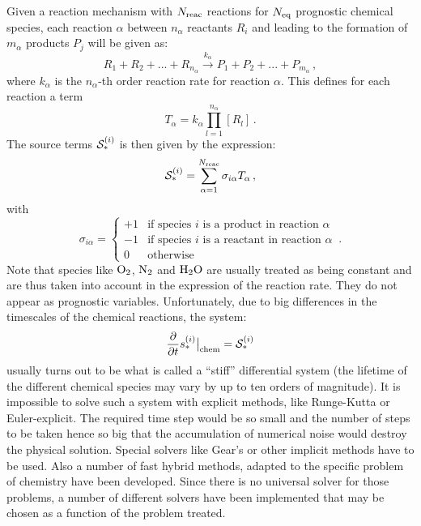 Given a reaction mechanism with $N_{\rm reac}$ reactions for $N_{\rm eq}$ prognostic
chemical species,
each reaction $\alpha$ between $n_\alpha$
reactants $R_i$ and leading to the formation
of $m_\alpha$ products $P_j$ will be given as:
%
\begin{equation}
R_1 + R_2 + ... + R_{n_\alpha} \stackrel{k_\alpha}{\longrightarrow}
P_1 + P_2 + ... + P_{m_\alpha}
\,,
\end{equation}
%
where $k_\alpha$ is the $n_\alpha$-th order reaction rate for reaction $\alpha$.
This defines for each reaction a term
%
\begin{equation}
  T_\alpha = k_\alpha \prod_{l=1}^{n_\alpha} [R_l]
  \,.
\end{equation}
%
The source terms ${\cal S}_\ast^{(i)}$ is then given by the expression:
%
\begin{equation}
  {\cal S}_\ast^{(i)} = \sum_{\alpha=1}^{N_{\rm reac}} \sigma_{i\alpha}  T_\alpha
  \,,
\end{equation}
%
with
%
\begin{equation}
  \sigma_{i\alpha} = \left\{
    \begin{array}{rl}
      +1 & \mbox{if species $i$ is a product in reaction $\alpha$} \\
      -1 & \mbox{if species $i$ is a reactant in reaction $\alpha$} \\
      0 & \mbox{otherwise}
    \end{array}
  \right.\,.
\end{equation}
%
Note that species like $\rm O_2$, $\rm N_2$ and $\rm H_2O$
are usually treated as being  constant and are thus taken into account
in the expression of the reaction rate.
They do not appear as prognostic variables.
Unfortunately, due to big differences in the timescales of the
chemical reactions, the system:
%
\begin{equation}
  \frac{\partial}{\partial t} {s}_\ast^{(i)}\big|_{\rm chem} = {\cal S}_\ast^{(i)}
\end{equation}
%
usually turns out to be what is called a ``stiff'' differential system
(the lifetime of the different chemical species may vary by up to
ten orders of magnitude). 
It is impossible to solve such a system with explicit methods, like
Runge-Kutta or Euler-explicit.
The required time step would be so small and the number
of steps to be taken hence so big that the accumulation of numerical
noise would destroy the physical solution.
Special solvers like Gear's or other implicit methods have to be used.
Also a number of fast hybrid methods, adapted to the specific problem
of chemistry have been developed.
Since there is no universal solver for those problems,
a number of different solvers have been implemented that may
be chosen as a function of the problem treated.

